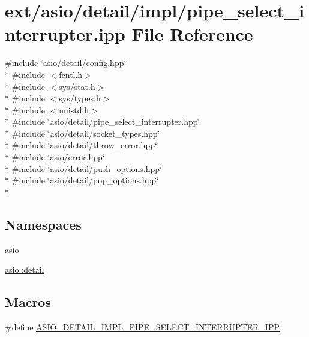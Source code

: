 \hypertarget{pipe__select__interrupter_8ipp}{}\section{ext/asio/detail/impl/pipe\+\_\+select\+\_\+interrupter.ipp File Reference}
\label{pipe__select__interrupter_8ipp}
{\ttfamily \#include \char`\"{}asio/detail/config.\+hpp\char`\"{}}\\*
{\ttfamily \#include $<$fcntl.\+h$>$}\\*
{\ttfamily \#include $<$sys/stat.\+h$>$}\\*
{\ttfamily \#include $<$sys/types.\+h$>$}\\*
{\ttfamily \#include $<$unistd.\+h$>$}\\*
{\ttfamily \#include \char`\"{}asio/detail/pipe\+\_\+select\+\_\+interrupter.\+hpp\char`\"{}}\\*
{\ttfamily \#include \char`\"{}asio/detail/socket\+\_\+types.\+hpp\char`\"{}}\\*
{\ttfamily \#include \char`\"{}asio/detail/throw\+\_\+error.\+hpp\char`\"{}}\\*
{\ttfamily \#include \char`\"{}asio/error.\+hpp\char`\"{}}\\*
{\ttfamily \#include \char`\"{}asio/detail/push\+\_\+options.\+hpp\char`\"{}}\\*
{\ttfamily \#include \char`\"{}asio/detail/pop\+\_\+options.\+hpp\char`\"{}}\\*
\subsection*{Namespaces}
\begin{DoxyCompactItemize}
\item 
 \hyperlink{namespaceasio}{asio}
\item 
 \hyperlink{namespaceasio_1_1detail}{asio\+::detail}
\end{DoxyCompactItemize}
\subsection*{Macros}
\begin{DoxyCompactItemize}
\item 
\#define \hyperlink{pipe__select__interrupter_8ipp_a4586871a1b8f932d3e32f12007a73956}{A\+S\+I\+O\+\_\+\+D\+E\+T\+A\+I\+L\+\_\+\+I\+M\+P\+L\+\_\+\+P\+I\+P\+E\+\_\+\+S\+E\+L\+E\+C\+T\+\_\+\+I\+N\+T\+E\+R\+R\+U\+P\+T\+E\+R\+\_\+\+I\+P\+P}
\end{DoxyCompactItemize}


